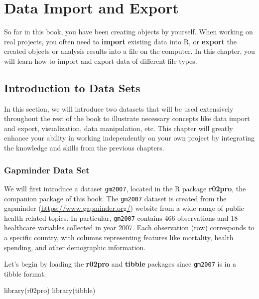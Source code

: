 \documentclass[
]{book}
\newenvironment{Shaded}{\begin{snugshade}}{\end{snugshade}}
\newcommand{\FunctionTok}[1]{\textcolor[rgb]{0.00,0.00,0.00}{#1}}
\newcommand{\NormalTok}[1]{#1}
\begin{document}
\hypertarget{import-export}{%
\chapter{Data Import and Export}\label{import-export}}

So far in this book, you have been creating objects by yourself. When working on real projects, you often need to \textbf{import} existing data into R, or \textbf{export} the created objects or analysis results into a file on the computer. In this chapter, you will learn how to import and export data of different file types.

\hypertarget{intro-dataset}{%
\section{Introduction to Data Sets}\label{intro-dataset}}

In this section, we will introduce two datasets that will be used extensively throughout the rest of the book to illustrate necessary concepts like data import and export, visualization, data manipulation, etc. This chapter will greatly enhance your ability in working independently on your own project by integrating the knowledge and skills from the previous chapters.

\hypertarget{intro-gapminder}{%
\subsection{Gapminder Data Set}\label{intro-gapminder}}

We will first introduce a dataset \texttt{gm2007}, located in the R package \textbf{r02pro}, the companion package of this book. The \texttt{gm2007} dataset is created from the gapminder (\url{https://www.gapminder.org/}) website from a wide range of public health related topics. In particular, \texttt{gm2007} contains 466 observations and 18 healthcare variables collected in year 2007. Each observation (row) corresponds to a specific country, with columns representing features like mortality, health spending, and other demographic information.

Let's begin by loading the \textbf{r02pro} and \textbf{tibble} packages since \texttt{gm2007} is in a tibble format.

\begin{Shaded}
\begin{Highlighting}[]
\FunctionTok{library}\NormalTok{(r02pro)}
\FunctionTok{library}\NormalTok{(tibble)}
\end{Highlighting}
\end{Shaded}
\end{document}
